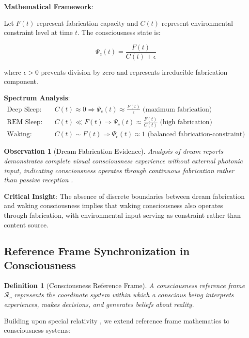 \documentclass[12pt,a4paper]{article}
\newtheorem{definition}[theorem]{Definition}
\newtheorem{observation}[theorem]{Observation}
\begin{document}
\textbf{Mathematical Framework}:

Let $F(t)$ represent fabrication capacity and $C(t)$ represent environmental constraint level at time $t$. The consciousness state is:

$$\Psi_c(t) = \frac{F(t)}{C(t) + \epsilon}$$

where $\epsilon > 0$ prevents division by zero and represents irreducible fabrication component.

\textbf{Spectrum Analysis}:
\begin{align}
\text{Deep Sleep:} \quad &C(t) \approx 0 \Rightarrow \Psi_c(t) \approx \frac{F(t)}{\epsilon} \text{ (maximum fabrication)}\\
\text{REM Sleep:} \quad &C(t) \ll F(t) \Rightarrow \Psi_c(t) \approx \frac{F(t)}{C(t)} \text{ (high fabrication)}\\
\text{Waking:} \quad &C(t) \sim F(t) \Rightarrow \Psi_c(t) \approx 1 \text{ (balanced fabrication-constraint)}
\end{align}

\begin{observation}[Dream Fabrication Evidence]
Analysis of dream reports demonstrates complete visual consciousness experience without external photonic input, indicating consciousness operates through continuous fabrication rather than passive reception \citep{hobson2002dreaming, revonsuo2000reinterpretation}.
\end{observation}

\textbf{Critical Insight}: The absence of discrete boundaries between dream fabrication and waking consciousness implies that waking consciousness also operates through fabrication, with environmental input serving as constraint rather than content source.

\subsection{Reference Frame Synchronization in Consciousness}

\begin{definition}[Consciousness Reference Frame]
A consciousness reference frame $\mathcal{R}_c$ represents the coordinate system within which a conscious being interprets experiences, makes decisions, and generates beliefs about reality.
\end{definition}

Building upon special relativity \citep{einstein1905electrodynamics}, we extend reference frame mathematics to consciousness systems:
\end{document}
